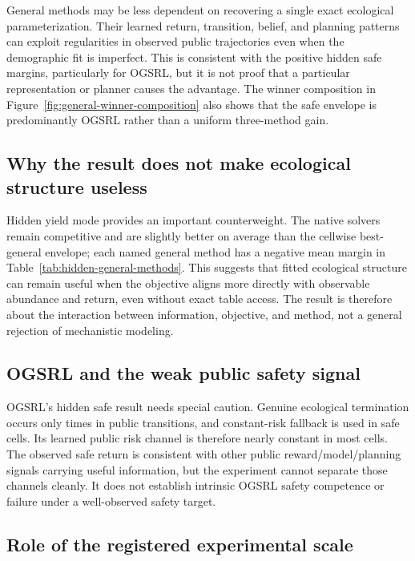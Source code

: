 \documentclass[11pt]{article}
\begin{document}
General methods may be less dependent on recovering a single exact ecological
parameterization.  Their learned return, transition, belief, and planning
patterns can exploit regularities in observed public trajectories even when
the demographic fit is imperfect.  This is consistent with the positive
hidden safe margins, particularly for OGSRL, but it is not proof that a
particular representation or planner causes the advantage.  The winner
composition in Figure~\ref{fig:general-winner-composition} also shows that the
safe envelope is predominantly OGSRL rather than a uniform three-method gain.

\subsection{Why the result does not make ecological structure useless}

Hidden yield mode provides an important counterweight.  The native solvers
remain competitive and are slightly better on average than the cellwise
best-general envelope; each named general method has a negative mean margin in
Table~\ref{tab:hidden-general-methods}.  This suggests that fitted ecological
structure can remain useful when the objective aligns more directly with
observable abundance and return, even without exact table access.  The result
is therefore about the interaction between information, objective, and method,
not a general rejection of mechanistic modeling.

\subsection{OGSRL and the weak public safety signal}

OGSRL's hidden safe result needs special caution.  Genuine ecological
termination occurs only \TerminationEvents{} times in
\TerminationTransitions{} public transitions, and constant-risk fallback is
used in \RiskFallbackCells{} safe cells.  Its learned public risk channel is
therefore nearly constant in most cells.  The observed safe return is
consistent with other public reward/model/planning signals carrying useful
information, but the experiment cannot separate those channels cleanly.  It
does not establish intrinsic OGSRL safety competence or failure under a
well-observed safety target.

\subsection{Role of the registered experimental scale}
\end{document}

